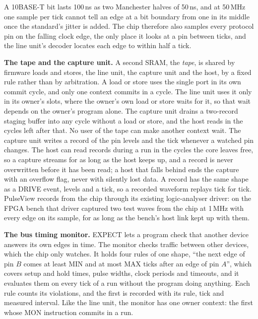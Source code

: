 \documentclass[conference,letterpaper]{IEEEtran}
\begin{document}
A 10BASE-T bit lasts 100\,ns as two Manchester halves of 50\,ns, and at 50\,MHz one sample per tick cannot tell
an edge at a bit boundary from one in its middle once the standard's jitter is added. The
chip therefore also samples every protocol pin on the falling clock edge, the only place
it looks at a pin between ticks, and the line unit's decoder locates each edge to within half
a tick.

\textbf{The tape and the capture unit.} A second SRAM, the \emph{tape}, is shared by
firmware loads and stores, the line unit, the capture unit and the host, by a fixed rule
rather than by arbitration. A load or store uses the single port in its own commit cycle,
and only one context commits in a cycle. The line unit uses it only in its owner's slots,
where the owner's own load or store waits for it, so that wait depends on the owner's
program alone. The capture unit drains a two-record staging buffer into any cycle without
a load or store, and the host reads in the cycles left after that. No user of the tape
can make another context wait. The capture unit writes a record of
the pin levels and the tick whenever a watched pin changes. The host can read records
during a run in the cycles the core leaves free, so a capture streams for as long as the
host keeps up, and a record is never overwritten before it has been read; a host that
falls behind ends the capture with an overflow flag, never with silently lost data. A
record has the same shape as a DRIVE event, levels and a tick, so a recorded waveform
replays tick for tick. PulseView \cite{sigrok} records from the chip through its
existing logic-analyser driver: on the FPGA bench that driver captured two test waves from
the chip at 1\,MHz with every edge on its sample, for as long as the bench's host link
kept up with them.

\textbf{The bus timing monitor.} EXPECT lets a program check that another device answers
its own edges in time. The monitor checks traffic between other devices, which the chip
only watches. It holds four rules of one shape, ``the next edge of pin $B$ comes at least
MIN and at most MAX ticks after an edge of pin $A$'', which covers setup and hold times,
pulse widths, clock periods and timeouts, and it evaluates them on every tick of a run
without the program doing anything. Each rule counts its violations, and the first is
recorded with its rule, tick and measured interval. Like the line unit, the monitor has
one owner context: the first whose MON instruction commits in a run.

\end{document}
